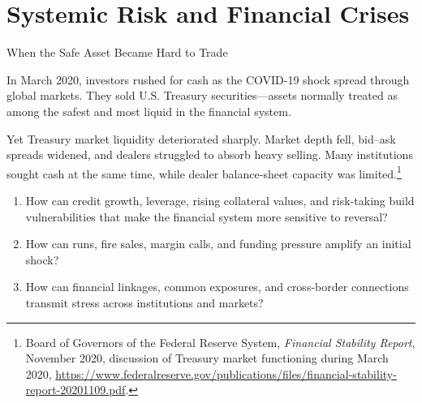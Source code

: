\chapter{Systemic Risk and Financial Crises}
\label{chap:Systemic_Risk_and_Financial_Crises}

\begin{openingcase}{When the Safe Asset Became Hard to Trade}

In March 2020, investors rushed for cash as the COVID-19 shock spread through global markets. They sold U.S. Treasury securities---assets normally treated as among the safest and most liquid in the financial system.

Yet Treasury market liquidity deteriorated sharply. Market depth fell, bid--ask spreads widened, and dealers struggled to absorb heavy selling. Many institutions sought cash at the same time, while dealer balance-sheet capacity was limited.\footnote{Board of Governors of the Federal Reserve System, \emph{Financial Stability Report}, November 2020, discussion of Treasury market functioning during March 2020, \url{https://www.federalreserve.gov/publications/files/financial-stability-report-20201109.pdf}.}

\end{openingcase}


\begin{tcolorbox}[
  enhanced,
  colback=FinanceBlue!6,
  colframe=FinanceBlue,
  boxrule=0.6pt,
  sharp corners,
  left=8pt,
  right=8pt,
  top=7pt,
  bottom=7pt,
  before skip=1em,
  after skip=1.6em,
  title=\textbf{Core Questions},
  coltitle=white,
  colbacktitle=FinanceBlue,
  fonttitle=\bfseries,
  attach boxed title to top left={xshift=6pt,yshift=-2mm},
  boxed title style={
    boxrule=0pt,
    sharp corners,
    left=5pt,
    right=5pt,
    top=2pt,
    bottom=2pt
  }
]
\begin{enumerate}[
  leftmargin=*,
  label=\textcolor{FinanceBlue}{\textbf{\arabic*.}},
  itemsep=0.55em,
  topsep=0.2em
]

\item How can credit growth, leverage, rising collateral values, and risk-taking build vulnerabilities that make the financial system more sensitive to reversal?

\item How can runs, fire sales, margin calls, and funding pressure amplify an initial shock?

\item How can financial linkages, common exposures, and cross-border connections transmit stress across institutions and markets?

\end{enumerate}
\end{tcolorbox}


